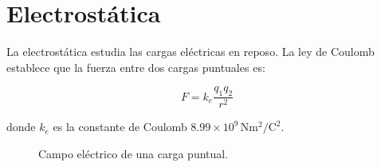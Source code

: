 \section{Electrostática}

La electrostática estudia las cargas eléctricas en reposo. La ley de Coulomb establece que la fuerza entre dos cargas puntuales es:

\begin{equation}
    F = k_e \frac{q_1 q_2}{r^2}
\end{equation}

donde \( k_e \) es la constante de Coulomb \( 8.99 \times 10^9 \,\si{\newton\meter\squared\per\coulomb\squared} \).

\begin{figure}[h]
    \centering
    \caption{Campo eléctrico de una carga puntual.}
    \label{fig:campo_electrico}
\end{figure}
